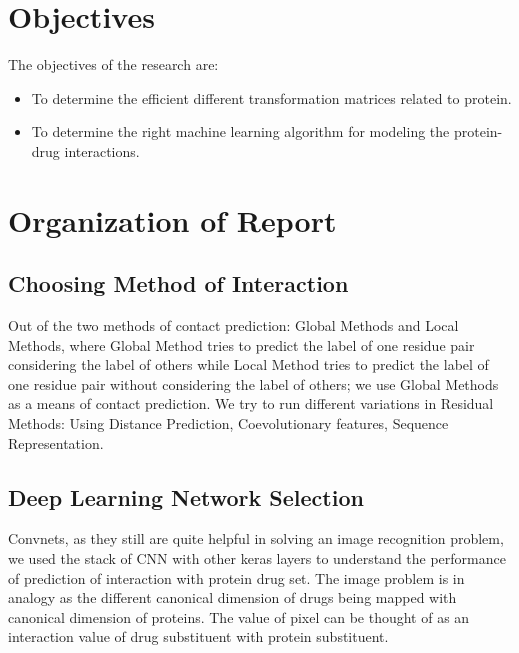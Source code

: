 \section{Objectives}
The objectives of the research are:
\begin{itemize}
    \setlength\parindent{36pt}
    \item To determine the efficient different transformation matrices related to protein.
    \item To determine the right machine learning algorithm for modeling the protein-drug interactions.
\end{itemize}




\section{Organization of Report}

\subsection{Choosing Method of Interaction}
Out of the two methods of contact prediction: Global Methods and Local Methods, where Global Method tries to predict the label of one residue pair considering the label of others while Local Method tries to predict the label of one residue pair without considering the label of others; we use Global Methods as a means of contact prediction. We try to run different variations in Residual Methods: Using Distance Prediction, Coevolutionary features, Sequence Representation. 

\iffalse
\subsection{Creating Analogy with Image}
For any protein sequence, instead of regarding them as segments, we try to run the whole protein sequence as an image: the residual contacts representing the pixels of the image.
\fi

\subsection{Deep Learning Network Selection}
Convnets, as they still are quite helpful in solving an image recognition problem, we used the stack of CNN with other keras layers to understand the performance of prediction of interaction with protein drug set. The image problem is in analogy as the different canonical dimension of drugs being mapped with canonical dimension of proteins. The value of pixel can be thought of as an interaction value of drug substituent with protein substituent.

